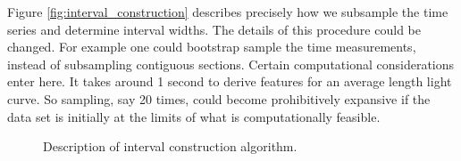\documentclass[10pt]{article}
\theoremstyle{definition}
\begin{document}
Figure \ref{fig:interval_construction} describes precisely how we subsample the time series and determine interval widths. The details of this procedure could be changed. For example one could bootstrap sample the time measurements, instead of subsampling contiguous sections. Certain computational considerations enter here. It takes around 1 second to derive features for an average length light curve. So sampling, say 20 times, could become prohibitively expansive if the data set is initially at the limits of what is computationally feasible.
\begin{figure}[ht]
\begin{center}
{\small
{}
}
\end{center}
\caption{Description of interval construction algorithm.\label{fig:interval_construction}}
\label{lb}
\end{figure}

\end{document}
